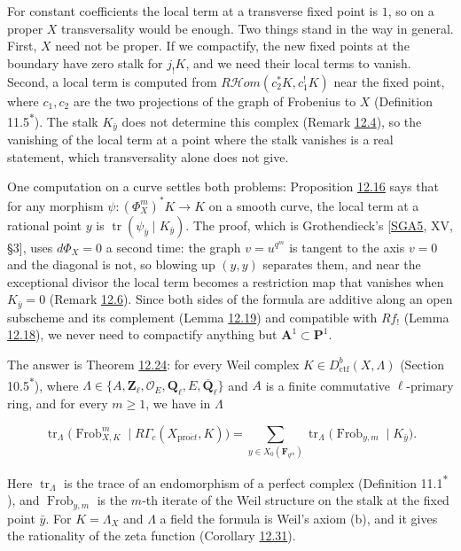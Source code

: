 \documentclass[11pt]{article}
\newcommand{\bpout}[1]{#1\textsuperscript{\hyperlink{bp-outside}{\ensuremath{\ast}}}}
\providecommand{\cHom}{}\renewcommand{\cHom}{R\mathcal{H}\!om}
\begin{document}
\label{bp4}%
For constant coefficients the local term at a transverse fixed point is \(1\), so on a proper \(X\) transversality would be enough. Two things stand in the way in general. First, \(X\) need not be proper. If we compactify, the new fixed points at the boundary have zero stalk for \(j_!K\), and we need their local terms to vanish. Second, a local term is computed from \(\cHom(c_2^*K,c_1^!K)\) near the fixed point, where \(c_1,c_2\) are the two projections of the graph of Frobenius to \(X\) (Definition \bpout{11.5}). The stalk \(K_{\bar y}\) does not determine this complex (Remark \hyperref[bp14]{12.4}), so the vanishing of the local term at a point where the stalk vanishes is a real statement, which transversality alone does not give.

One computation on a curve settles both problems: Proposition \hyperref[bp49]{12.16} says that for any morphism \(\psi:(\Phi_X^m)^*K\to K\) on a smooth curve, the local term at a rational point \(y\) is \(\operatorname{tr}(\psi_{\bar y}\mid K_{\bar y})\). The proof, which is Grothendieck's [\hyperref[bp105]{SGA5}, XV, §3], uses \(d\Phi_X=0\) a second time: the graph \(v=u^{q^m}\) is tangent to the axis \(v=0\) and the diagonal is not, so blowing up \((y,y)\) separates them, and near the exceptional divisor the local term becomes a restriction map that vanishes when \(K_{\bar y}=0\) (Remark \hyperref[bp18]{12.6}). Since both sides of the formula are additive along an open subscheme and its complement (Lemma \hyperref[bp58]{12.19}) and compatible with \(Rf_!\) (Lemma \hyperref[bp55]{12.18}), we never need to compactify anything but \(\mathbf A^1\subset\mathbf P^1\).

The answer is Theorem \hyperref[bp73]{12.24}: for every Weil complex \(K\in D^b_{\mathrm{ctf}}(X,\Lambda)\) (Section \bpout{10.5}), where \(\Lambda\in\{A,\mathbf Z_\ell,\mathcal O_E,\mathbf Q_\ell,E,\overline{\mathbf Q}_\ell\}\) and \(A\) is a finite commutative \(\ell\)-primary ring, and for every \(m\geq1\), we have in \(\Lambda\)

\[
\operatorname{tr}_\Lambda\bigl(\operatorname{Frob}_{X,K}^m\mid
R\Gamma_c(X_{\mathrm{pro}\acute{e}t},K)\bigr)
=\sum_{y\in X_0(\mathbf F_{q^m})}
\operatorname{tr}_\Lambda\bigl(\operatorname{Frob}_{y,m}\mid
K_{\bar y}\bigr).
\]

Here \(\operatorname{tr}_\Lambda\) is the trace of an endomorphism of a perfect complex (Definition \bpout{11.1}), and \(\operatorname{Frob}_{y,m}\) is the \(m\)-th iterate of the Weil structure on the stalk at the fixed point \(\bar y\). For \(K=\Lambda_X\) and \(\Lambda\) a field the formula is Weil's axiom (b), and it gives the rationality of the zeta function (Corollary \hyperref[bp95]{12.31}).
\end{document}
